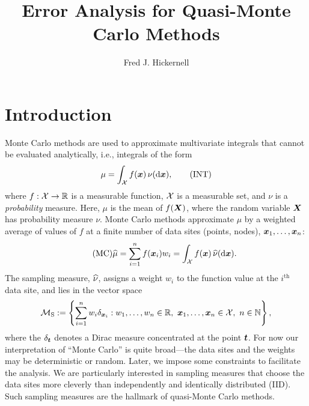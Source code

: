 \documentclass[graybox,footinfo]{svmult}
\begin{document}
\allowdisplaybreaks


\title*{Error Analysis for Quasi-Monte Carlo Methods}
\author{Fred J. Hickernell}
\maketitle


\section{Introduction}
Monte Carlo methods are used to approximate multivariate integrals that cannot be evaluated analytically, i.e.,  integrals of the form
\begin{equation}
\mu = \int_{\cx} f(\bsx) \, \nu(\D \bsx), \label{INT} \tag{INT}
\end{equation}
where $f:\mathcal{X} \to {\mathbb{R}}$ is a measurable function, $\mathcal{X}$ is a measurable set, and $\nu$ is a 
\emph{probability} measure.  Here, $\mu$ is the mean of $f({\boldsymbol{X}})$, where the random 
variable ${\boldsymbol{X}}$ has probability measure $\nu$.  Monte Carlo methods approximate 
$\mu$ by a weighted average of values of $f$ at a finite number of data sites (points, 
nodes), ${\boldsymbol{x}}_1, \ldots, {\boldsymbol{x}}_n$:
\begin{equation} \label{AppxINT} \tag{MC}
\hmu = \sum_{i=1}^n f(\bsx_i) w_i = \int_{\cx} f(\bsx) \, \hnu(\D \bsx).
\end{equation}
The sampling measure, $\widehat{\nu}$, assigns a weight $w_i$ to the function value at the 
$i^{\text{th}}$ data site, and lies in the vector space
\begin{equation} \label{FJH:eq:sampmeaset}
\cm_{\textup{S}} := \left \{\sum_{i=1}^n w_i \delta_{\bsx_i} : w_1, \ldots, w_n \in \R,\ \bsx_1, 
\ldots, \bsx_n \in \calX, \ n \in \N \right \},
\end{equation}
where the $\delta_{{\boldsymbol{t}}}$ denotes a Dirac measure concentrated at the point ${\boldsymbol{t}}$.  
For now our interpretation of ``Monte Carlo'' is quite broad---the data sites and the 
weights may be deterministic or random.  Later, we impose some constraints to facilitate 
the analysis.  We are 
particularly interested in sampling measures that choose the data sites more cleverly 
than independently and identically distributed (IID).  Such sampling measures are the 
hallmark of quasi-Monte Carlo methods.
\end{document}
